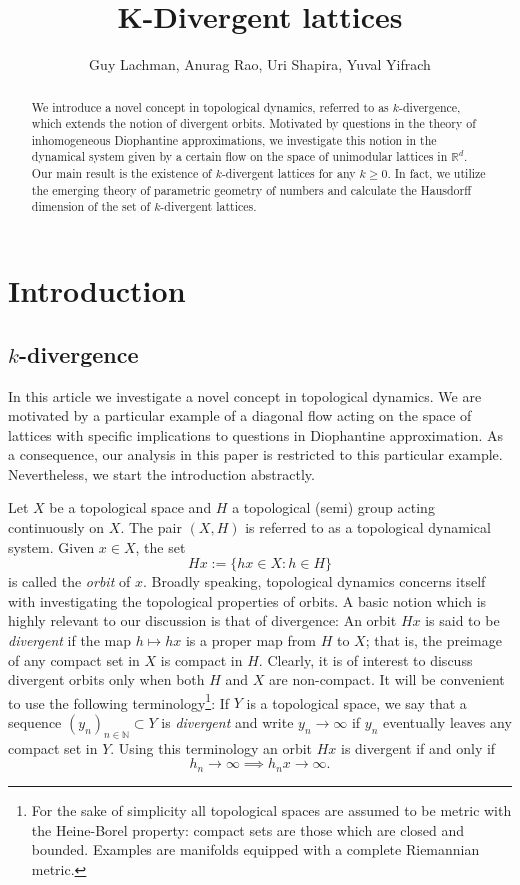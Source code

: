 \documentclass[reqno,11pt]{amsart}
\title[k-divergence]{K-Divergent lattices}
\author{Guy Lachman, Anurag Rao, Uri Shapira, Yuval Yifrach}
\theoremstyle{plain}
\theoremstyle{definition}
\theoremstyle{remark}
\numberwithin{equation}{section}
\newcommand{\N}{{\mathbb{N}}}
\newcommand{\bR}{\mathbb{R}}
\begin{document}
\begin{abstract}
    We introduce a novel concept in topological dynamics, referred to as $k$-divergence, which extends the notion of divergent orbits. Motivated by questions in the theory of inhomogeneous Diophantine approximations, we 
    investigate this notion in the dynamical system given by a certain flow on the space
    of unimodular lattices in $\bR^d$. Our main result is the existence of $k$-divergent lattices for any $k\ge 0$. In fact, we utilize the emerging theory of parametric geometry 
    of numbers and calculate the Hausdorff dimension of the set of $k$-divergent lattices.
\end{abstract}

\maketitle
\section{Introduction}
\subsection{$k$-divergence}
In this article we investigate a novel concept in topological dynamics. We are motivated by a particular example of a diagonal flow acting on the space of lattices with specific implications to questions in Diophantine approximation. As a consequence, our analysis in this paper is restricted to this particular example. Nevertheless, we start the introduction abstractly.

Let $X$ be a topological space and $H$ a topological (semi) group acting continuously on $X$. The pair $(X,H)$ is referred to as a topological dynamical 
system. Given $x\in X$, the set 
\begin{equation*}
    Hx:=\{hx \in X :h\in H\} 
\end{equation*}
is called the \textit{orbit} of $x$. Broadly speaking, topological dynamics concerns itself with investigating the topological properties of orbits. A basic notion which is highly relevant to our discussion is that of divergence: 
An orbit $Hx$ is said to be \textit{divergent} if the map
$h\mapsto hx$ is a proper map from $H$ to $X$; that is, the preimage of any compact set in $X$ is compact in $H$. Clearly, it is of interest to discuss
divergent orbits only when both $H$ and $X$ are non-compact.
It will be convenient to use the following terminology\footnote{For the sake of simplicity all topological spaces are assumed to be metric with the Heine-Borel property: compact sets are those which are closed and bounded. Examples are manifolds equipped with a complete Riemannian metric.}: If $Y$ is a topological space, we say that a sequence $(y_n)_{n \in \N}\subset Y$ is \textit{divergent} and write $y_n\to \infty $ if $y_n$ eventually 
leaves any compact set in $Y$. Using this terminology an orbit $Hx$ is divergent if and only if 
\begin{equation*}
    h_n\to \infty  \implies h_nx \to \infty. 
\end{equation*} 
\end{document}
